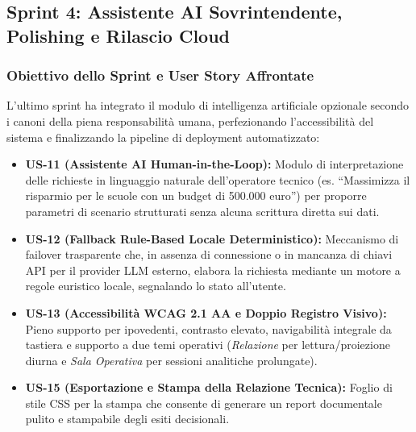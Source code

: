 \subsection{Sprint 4: Assistente AI Sovrintendente, Polishing e Rilascio Cloud}

\subsubsection{Obiettivo dello Sprint e User Story Affrontate}
L'ultimo sprint ha integrato il modulo di intelligenza artificiale opzionale secondo i canoni della piena responsabilità umana, perfezionando l'accessibilità del sistema e finalizzando la pipeline di deployment automatizzato:
\begin{itemize}[leftmargin=1.5em, itemsep=0.2em]
    \item \textbf{US-11 (Assistente AI Human-in-the-Loop):} Modulo di interpretazione delle richieste in linguaggio naturale dell'operatore tecnico (es. ``Massimizza il risparmio per le scuole con un budget di 500.000 euro'') per proporre parametri di scenario strutturati senza alcuna scrittura diretta sui dati.
    \item \textbf{US-12 (Fallback Rule-Based Locale Deterministico):} Meccanismo di failover trasparente che, in assenza di connessione o in mancanza di chiavi API per il provider LLM esterno, elabora la richiesta mediante un motore a regole euristico locale, segnalando lo stato all'utente.
    \item \textbf{US-13 (Accessibilità WCAG 2.1 AA e Doppio Registro Visivo):} Pieno supporto per ipovedenti, contrasto elevato, navigabilità integrale da tastiera e supporto a due temi operativi (\emph{Relazione} per lettura/proiezione diurna e \emph{Sala Operativa} per sessioni analitiche prolungate).
    \item \textbf{US-15 (Esportazione e Stampa della Relazione Tecnica):} Foglio di stile CSS per la stampa che consente di generare un report documentale pulito e stampabile degli esiti decisionali.
\end{itemize}

